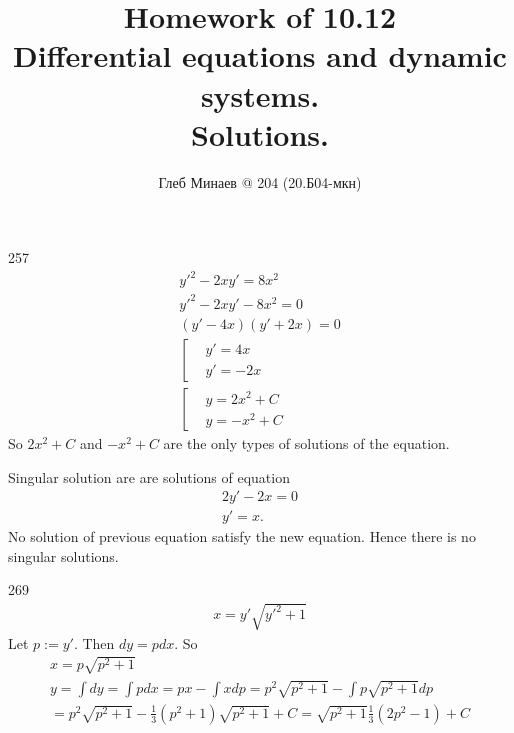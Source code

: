 \documentclass[12pt,a4paper]{article}
\title{Homework of 10.12\\Differential equations and dynamic systems.\\Solutions.}
\author{Глеб Минаев @ 204 (20.Б04-мкн)}
\date{}
\begin{document}
    \maketitle

    \begin{problem}{257}
        \begin{gather*}
            y'^2 - 2xy' = 8x^2\\
            y'^2 - 2xy' - 8x^2 = 0\\
            (y' - 4x)(y' + 2x) = 0\\
            \left[\begin{aligned}
                &y' = 4x\\
                &y' = -2x
            \end{aligned}\right.\\
            \left[\begin{aligned}
                &y = 2x^2 + C\\
                &y = -x^2 + C
            \end{aligned}\right.
        \end{gather*}
        So $2x^2 + C$ and $-x^2 + C$ are the only types of solutions of the equation.

        Singular solution are are solutions of equation
        \begin{gather*}
            2y' - 2x = 0\\
            y' = x.
        \end{gather*}
        No solution of previous equation satisfy the new equation. Hence there is no singular solutions.
    \end{problem}

    \begin{problem}{269}
        \begin{gather*}
            x = y' \sqrt{y'^2 + 1}
        \end{gather*}
        Let $p := y'$. Then $dy = p dx$. So
        \begin{gather*}
            x = p \sqrt{p^2 + 1}\\
            y = \int dy = \int pdx = px - \int x dp = p^2 \sqrt{p^2 + 1} - \int p\sqrt{p^2 + 1} dp\\
            = p^2 \sqrt{p^2 + 1} - \frac{1}{3} (p^2 + 1) \sqrt{p^2 + 1} + C = \sqrt{p^2 + 1} \frac{1}{3} (2p^2 - 1) + C
        \end{gather*}
    \end{problem}
\end{document}
